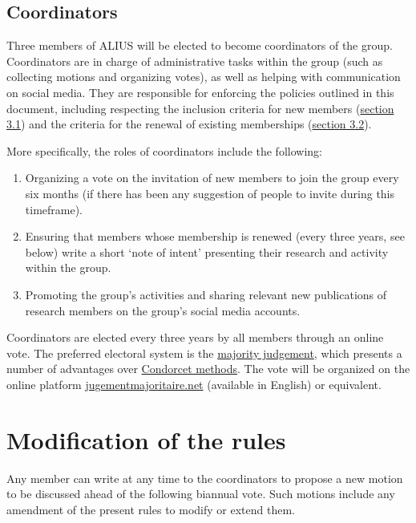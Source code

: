 \documentclass[a4paper, 11pt]{scrartcl}
\begin{document}
\subsection{Coordinators}
\label{coordinators}

Three members of ALIUS will be elected to become coordinators of the group. Coordinators are in charge of administrative tasks within the group (such as collecting motions and organizing votes), as well as helping with communication on social media. They are responsible for enforcing the policies outlined in this document, including respecting the inclusion criteria for new members (\hyperref[new_memberships]{section 3.1}) and the criteria for the renewal of existing memberships (\hyperref[membership_renewal]{section 3.2}).

More specifically, the roles of coordinators include the following:

\begin{enumerate}

\item Organizing a vote on the invitation of new members to join the group every six months (if there has been any suggestion of people to invite during this timeframe).
\item Ensuring that members whose membership is renewed (every three years, see below) write a short `note of intent' presenting their research and activity within the group.
\item Promoting the group's activities and sharing relevant new publications of research members on the group's social media accounts. 

\end{enumerate}

\noindent Coordinators are elected every three years by all members through an online vote. The preferred electoral system is the \href{https://en.wikipedia.org/wiki/Majority_judgment}{majority judgement}, which presents a number of advantages over \href{https://en.wikipedia.org/wiki/Condorcet_method}{Condorcet methods}. The vote will be organized on the online platform \href{https://jugementmajoritaire.net/}{jugementmajoritaire.net} (available in English) or equivalent.

\section{Modification of the rules}
\label{modif}

Any member can write at any time to the coordinators to propose a new motion to be discussed ahead of the following biannual vote. Such motions include any amendment of the present rules to modify or extend them. 
\end{document}
